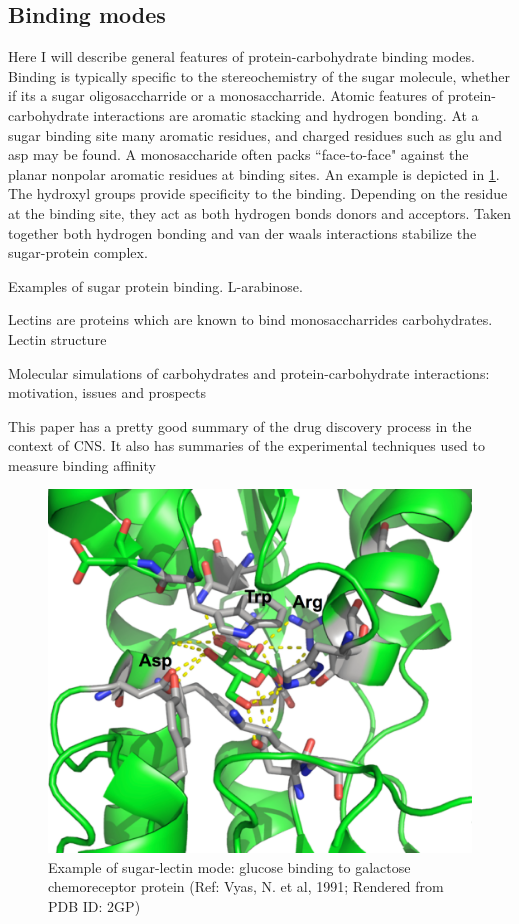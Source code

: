 \subsection{Binding modes}
Here I will describe general features of protein-carbohydrate binding modes. Binding is typically specific to the stereochemistry of the sugar molecule, whether if its a sugar oligosaccharride or a monosaccharride. Atomic features of protein-carbohydrate interactions are aromatic stacking and hydrogen bonding.\cite{Vyas:1991p6498}  At a sugar binding site many aromatic residues, and charged residues such as glu and asp may be found. A monosaccharide often packs ``face-to-face" against the planar nonpolar aromatic residues at binding sites.  An example is depicted in \ref{fig:sugar_protein}.  The hydroxyl groups provide specificity to the binding.  Depending on the residue at the binding site, they act as both hydrogen bonds donors and acceptors. Taken together both hydrogen bonding and van der waals interactions stabilize the sugar-protein complex.

Examples of sugar protein binding.  L-arabinose. %

Lectins are proteins which are known to bind monosaccharrides carbohydrates. Lectin structure\cite{Rini:1995p2497}

Molecular simulations of carbohydrates and protein-carbohydrate interactions: motivation, issues and prospects\cite{Fadda:2010p5889}

This paper has a pretty good summary of the drug discovery process in the context of CNS. It also has summaries of the experimental techniques used to measure binding affinity\cite{Hubbard:2011fs}

\begin{figure}
  \centering
  \includegraphics[width=6in]{figures/introduction/sugar_protein_binding.pdf}
  \caption[Sugar protein example]{Example of sugar-lectin mode: glucose binding to galactose chemoreceptor protein (Ref: Vyas, N. et al, 1991; Rendered from PDB ID: 2GP)}
  \label{fig:sugar_protein}
\end{figure}



